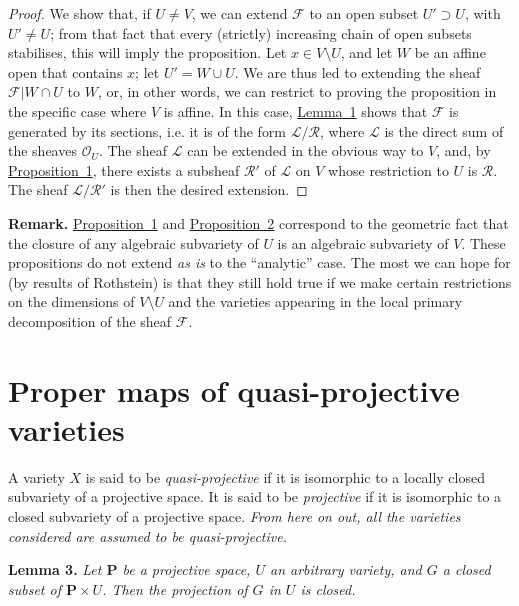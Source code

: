 \documentclass{article}
\newenvironment{itenv}[1]
  {\phantomsection\par\medskip\noindent\textbf{#1.}\itshape}
  {\medskip}
\newenvironment{rmenv}[1]
  {\phantomsection\par\medskip\noindent\textbf{#1.}\rmfamily}
  {\medskip}
\newcommand{\scr}[1]{{\mathscr{#1}}}
\newcommand{\PP}{\mathbf{P}}
\begin{document}
\begin{proof}
  We show that, if $U\neq V$, we can extend $\scr{F}$ to an open subset $U'\supset U$, with $U'\neq U$;
  from that fact that every (strictly) increasing chain of open subsets stabilises, this will imply the proposition.
  Let $x\in V\setminus U$, and let $W$ be an affine open that contains $x$;
  let $U'=W\cup U$.
  We are thus led to extending the sheaf $\scr{F}|W\cap U$ to $W$, or, in other words, we can restrict to proving the proposition in the specific case where $V$ is affine.
  In this case, \hyperref[lemma1]{Lemma~1} shows that $\scr{F}$ is generated by its sections, i.e. it is of the form $\scr{L}/\scr{R}$, where $\scr{L}$ is the direct sum of the sheaves $\scr{O}_U$.
  The sheaf $\scr{L}$ can be extended in the obvious way to $V$, and, by \hyperref[proposition1]{Proposition~1}, there exists a subsheaf $\scr{R}'$ of $\scr{L}$ on $V$ whose restriction to $U$ is $\scr{R}$.
  The sheaf $\scr{L}/\scr{R}'$ is then the desired extension.
\end{proof}

\begin{rmenv}{Remark}
  \hyperref[proposition1]{Proposition~1} and \hyperref[proposition2]{Proposition~2} correspond to the geometric fact that the closure of any algebraic subvariety of $U$ is an algebraic subvariety of $V$.
  These propositions do not extend \emph{as is} to the ``analytic'' case.
  The most we can hope for (by results of Rothstein) is that they still hold true if we make certain restrictions on the dimensions of $V\setminus U$ and the varieties appearing in the local primary decomposition of the sheaf $\scr{F}$.
\end{rmenv}


\section{Proper maps of quasi-projective varieties}
\label{section2}

A variety $X$ is said to be \emph{quasi-projective} if it is isomorphic to a locally closed subvariety of a projective space.
It is said to be \emph{projective} if it is isomorphic to a closed subvariety of a projective space.
\emph{From here on out, all the varieties considered are assumed to be quasi-projective.}

\begin{itenv}{Lemma 3}
\label{lemma3}
  Let $\PP$ be a projective space, $U$ an arbitrary variety, and $G$ a closed subset of $\PP\times U$.
  Then the projection of $G$ in $U$ is closed.
\end{itenv}
\end{document}
